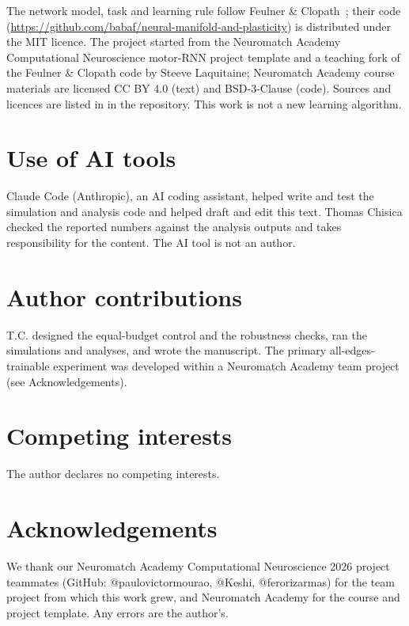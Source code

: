 \documentclass[11pt]{article}
\begin{document}
The network model, task and learning rule follow Feulner \&
Clopath~\cite{feulner2021neural}; their code
(\url{https://github.com/babaf/neural-manifold-and-plasticity}) is distributed
under the MIT licence. The project started from the Neuromatch Academy
Computational Neuroscience motor-RNN project template and a teaching fork of
the Feulner \& Clopath code by Steeve Laquitaine; Neuromatch Academy course
materials are licensed CC BY 4.0 (text) and BSD-3-Clause (code). Sources and
licences are listed in  in the repository. This work
is not a new learning algorithm.

\section*{Use of AI tools}

Claude Code (Anthropic), an AI coding assistant, helped write and test the
simulation and analysis code and helped draft and edit this text. Thomas
Chisica checked the reported numbers against the analysis outputs and takes
responsibility for the content. The AI tool is not an author.

\section*{Author contributions}

T.C. designed the equal-budget control and the robustness checks, ran the
simulations and analyses, and wrote the manuscript. The primary
all-edges-trainable experiment was developed within a Neuromatch Academy
team project (see Acknowledgements).

\section*{Competing interests}

The author declares no competing interests.

\section*{Acknowledgements}

We thank our Neuromatch Academy Computational Neuroscience 2026 project
teammates (GitHub: @paulovictormourao, @Keshi, @ferorizarmas) for the team
project from which this work grew, and Neuromatch Academy for the course and
project template. Any errors are the author's.



\end{document}
